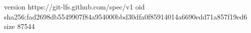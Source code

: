 version https://git-lfs.github.com/spec/v1
oid sha256:fad2698db5549907f84a954000bbd30dfa0f85914014a6690edd71a857f19ed6
size 87544
